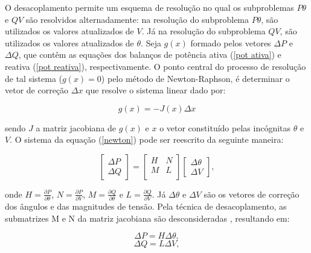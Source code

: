 \documentclass[
	12pt,				%
	openany,			%
	twoside,			%
	a4paper,			%
	chapter=TITLE,		%
	section=Title,		%
	subsection=Title,	%
	subsubsection=Title,%
	english,			%
	french,				%
	spanish,			%
	brazil			%
	]{abntex2}
\begin{document}
\begin{ERRATA}
O desacoplamento permite um esquema de resolução no qual os subproblemas $P\theta$ e $QV$ são resolvidos alternadamente: na resolução do subproblema $P\theta$, são utilizados os valores atualizados de $V$. Já na resolução do subproblema $QV$, são utilizados os valores atualizados de $\theta$. Seja $g(x)$ formado pelos vetores $\Delta P$ e $\Delta Q$, que contêm as equações dos balanços de potência ativa (\ref{pot ativa}) e reativa (\ref{pot reativa}), respectivamente. O ponto central do processo de resolução de tal sistema ($g(x)=0$) pelo método de Newton-Raphson, é determinar o vetor de correção $\Delta x $ que resolve o sistema linear dado por:

\begin{equation} \label{newton}
g(x) = -J(x)\Delta x
\end{equation}

\noindent sendo $J$ a matriz jacobiana  de $g(x)$ e $x$ o vetor constituído pelas incógnitas $\theta$ e $V$. O sistema da equação (\ref{newton}) pode ser reescrito da seguinte maneira: 

\begin{equation} \label{newton2}
\begin{bmatrix}\Delta P\\ \Delta Q\end{bmatrix} = \begin{bmatrix}
H & N\\
M & L\\
\end{bmatrix} \begin{bmatrix} \Delta \theta\\ \Delta V
\end{bmatrix},
\end{equation}

\noindent onde $H=\frac{\partial P}{\partial \theta}$, $N=\frac{\partial P}{\partial V}$, $M=\frac{\partial Q}{\partial \theta}$ e $L=\frac{\partial Q}{\partial V}$. Já $\Delta \theta$ e $\Delta V$ são os vetores de correção dos ângulos e das magnitudes de tensão. Pela técnica de desacoplamento, as submatrizes M e N da matriz jacobiana são desconsideradas \cite{monticelli1983fluxo}, resultando em:

\begin{equation}\label{deltap}
\Delta P = H\Delta \theta,
\end{equation}
\begin{equation}\label{deltaq}
\Delta Q = L\Delta V,
\end{equation}


\end{ERRATA}
\end{document}
